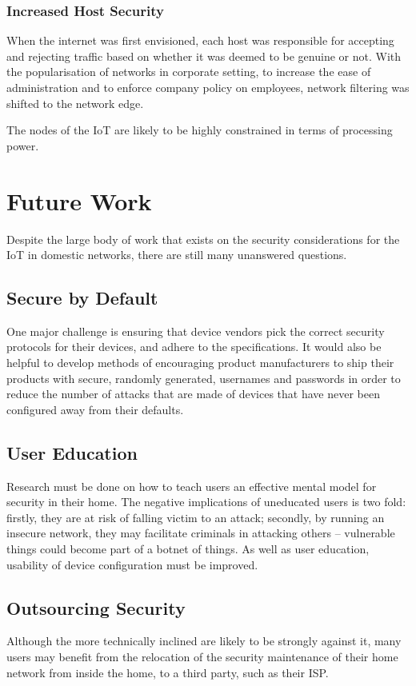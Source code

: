 \documentclass[10pt,journal,compsoc]{IEEEtran}
\begin{document}
\subsubsection{Increased Host Security}
When the internet was first envisioned, each host was responsible for accepting
and rejecting traffic based on whether it was deemed to be genuine or not. With
the popularisation of networks in corporate setting, to increase the ease of
administration and to enforce company policy on employees, network filtering
was shifted to the network edge.

The nodes of the IoT are likely to be highly constrained in terms of processing
power. 


\section{Future Work}
Despite the large body of work that exists on the security considerations for
the IoT in domestic networks, there are still many unanswered questions. 

\subsection{Secure by Default}
One major challenge is ensuring that device vendors pick the correct security
protocols for their devices, and adhere to the specifications. It would also be
helpful to develop methods of encouraging product manufacturers to ship their
products with secure, randomly generated, usernames and passwords in order to
reduce the number of attacks that are made of devices that have never been
configured away from their defaults.

\subsection{User Education}
Research must be done on how to teach users an effective mental model for
security in their home. The negative implications of uneducated users is two
fold: firstly, they are at risk of falling victim to an attack; secondly, by
running an insecure network, they may facilitate criminals in attacking others
-- vulnerable things could become part of a botnet of things. As well as user
education, usability of device configuration must be improved. 

\subsection{Outsourcing Security}
Although the more technically inclined are likely to be strongly against it, many
users may benefit from the relocation of the security maintenance of their home
network from inside the home, to a third party, such as their ISP. 
\end{document}
